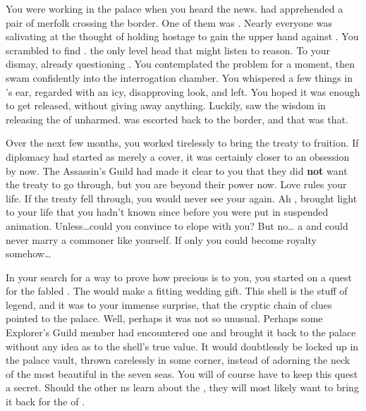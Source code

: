 \documentclass[char]{NeptuneBall}
\begin{document}
You were working in the palace when you heard the news. \cPrince{\Prince} \cPrince{} had apprehended a pair of merfolk crossing the border. One of them was \cPrincess{\prince} \cPrincess{}. Nearly everyone was salivating at the thought of holding \cPrincess{\them} hostage to gain the upper hand against \pAtlantis{}. You scrambled to find \cPrince{}. \cPrince{\They} \cPrince{\were} the only level head that might listen to reason. To your dismay, \cPrince{\they} \cPrince{\were} already questioning \cPrincess{}. You contemplated the problem for a moment, then swam confidently into the interrogation chamber. You whispered a few things in \cPrince{}'s ear, regarded \cPrincess{} with an icy, disapproving look, and left. You hoped it was enough to get \cPrincess{\them} released, without giving away anything. Luckily, \cPrince{} saw the wisdom in releasing the \cPrincess{\prince} of \pAtlantis{} unharmed. \cPrincess{} was escorted back to the border, and that was that.

Over the next few months, you worked tirelessly to bring the treaty to fruition. If diplomacy had started as merely a cover, it was certainly closer to an obsession by now. The Assassin's Guild had made it clear to you that they did {\bf not} want the treaty to go through, but you are beyond their power now. Love rules your life. If the treaty fell through, you would never see your \cPrincess{} again. Ah \cPrincess{}, \cPrincess{\they} brought light to your life that you hadn't known since before you were put in suspended animation. Unless\ldots could you convince \cPrincess{} to elope with you? But no\ldots \cPrincess{\they} \cPrincess{\are} a \cPrincess{\prince} and could never marry a commoner like yourself. If only you could become royalty somehow\ldots

In your search for a way to prove how precious \cPrincess{} is to you, you started on a quest for the fabled \iGlowShell{\MYname}. The \iGlowShell{\MYname} would make a fitting wedding gift. This shell is the stuff of legend, and it was to your immense surprise, that the cryptic chain of clues pointed to the \pAtlantis{} palace. Well, perhaps it was not so unusual. Perhaps some Explorer's Guild member had encountered one and brought it back to the palace without any idea as to the shell's true value. It would doubtlessly be locked up in the palace vault, thrown carelessly in some corner, instead of adorning the neck of the most beautiful \cPrincess{\mer} in the seven seas. You will of course have to keep this quest a secret. Should the other \pPacifica{}ns learn about the \iGlowShell{}, they will most likely want to bring it back for the \cPacificanRuler{\King} of \pPacifica{}.
\end{document}
